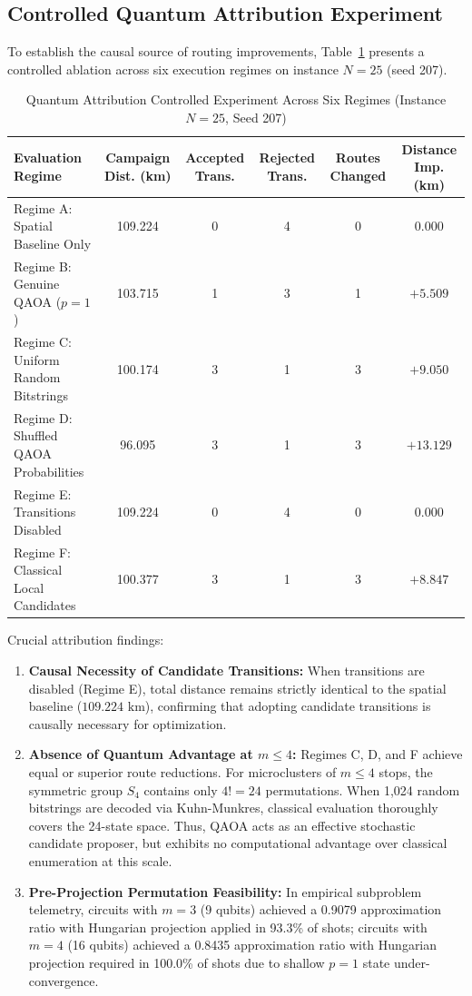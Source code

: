 \documentclass[journal,10pt]{IEEEtran}
\begin{document}
\subsection{Controlled Quantum Attribution Experiment}
To establish the causal source of routing improvements, Table~\ref{tab:attribution} presents a controlled ablation across six execution regimes on instance $N=25$ (seed 207).

\begin{table}[t]
\caption{Quantum Attribution Controlled Experiment Across Six Regimes (Instance $N=25$, Seed 207)}
\label{tab:attribution}
\centering
\begin{tabular}{lccccc}
\toprule
\textbf{Evaluation Regime} & \textbf{Campaign Dist. (km)} & \textbf{Accepted Trans.} & \textbf{Rejected Trans.} & \textbf{Routes Changed} & \textbf{Distance Imp. (km)} \\
\midrule
Regime A: Spatial Baseline Only       & 109.224 & 0 & 4 & 0 & 0.000 \\
Regime B: Genuine QAOA ($p=1$)        & 103.715 & 1 & 3 & 1 & $+5.509$ \\
Regime C: Uniform Random Bitstrings   & 100.174 & 3 & 1 & 3 & $+9.050$ \\
Regime D: Shuffled QAOA Probabilities & 96.095  & 3 & 1 & 3 & $+13.129$ \\
Regime E: Transitions Disabled        & 109.224 & 0 & 4 & 0 & 0.000 \\
Regime F: Classical Local Candidates  & 100.377 & 3 & 1 & 3 & $+8.847$ \\
\bottomrule
\end{tabular}
\end{table}

Crucial attribution findings:
\begin{enumerate}
    \item \textbf{Causal Necessity of Candidate Transitions:} When transitions are disabled (Regime E), total distance remains strictly identical to the spatial baseline ($109.224\text{ km}$), confirming that adopting candidate transitions is causally necessary for optimization.
    \item \textbf{Absence of Quantum Advantage at $m \le 4$:} Regimes C, D, and F achieve equal or superior route reductions. For microclusters of $m \le 4$ stops, the symmetric group $S_4$ contains only $4! = 24$ permutations. When 1,024 random bitstrings are decoded via Kuhn-Munkres, classical evaluation thoroughly covers the 24-state space. Thus, QAOA acts as an effective stochastic candidate proposer, but exhibits no computational advantage over classical enumeration at this scale.
    \item \textbf{Pre-Projection Permutation Feasibility:} In empirical subproblem telemetry, circuits with $m=3$ (9 qubits) achieved a 0.9079 approximation ratio with Hungarian projection applied in 93.3\% of shots; circuits with $m=4$ (16 qubits) achieved a 0.8435 approximation ratio with Hungarian projection required in 100.0\% of shots due to shallow $p=1$ state under-convergence.
\end{enumerate}
\end{document}
